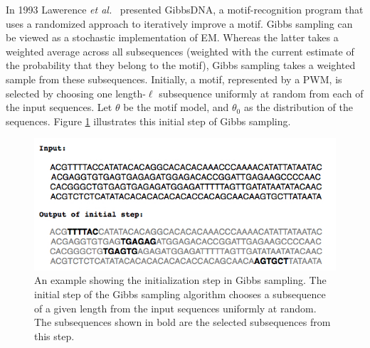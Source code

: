 In 1993 Lawerence {\em et al.}\ \cite{LABLNW} presented GibbsDNA, a motif-recognition program that uses a randomized approach to iteratively improve a motif. Gibbs sampling can be viewed as a stochastic implementation of EM. Whereas the latter takes a weighted average across all subsequences (weighted with the current estimate of the probability that they belong to the motif), Gibbs sampling takes a weighted sample from these subsequences. Initially, a motif, represented by a PWM, is selected by choosing one length-$\ell$ subsequence uniformly at random from each of the input sequences.  Let $\theta$ be the motif model, and $\theta_0$ as the distribution of the sequences.  Figure \ref{fig:gibbs_example1} illustrates this initial step of Gibbs sampling.

\begin{figure}[h!]
\begin{center}
 \includegraphics[width=\linewidth]{images/gibbs_example1}
\caption[An example showing the initialization step in Gibbs sampling.]{An example showing the initialization step in Gibbs sampling. The initial step of the Gibbs sampling algorithm chooses a subsequence of a given length from the input sequences uniformly at random.  The subsequences shown in bold are the selected subsequences from this step.}
\label{fig:gibbs_example1}
\end{center}
\end{figure}

